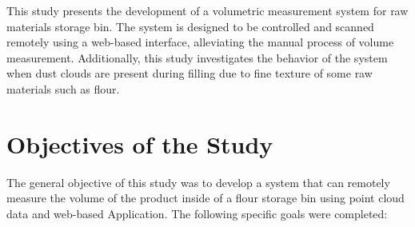 

This study presents the development of a volumetric measurement system for raw materials storage bin. The system is designed to be controlled and scanned remotely using a web-based interface, alleviating the manual process of volume measurement. Additionally, this study investigates the behavior of the system when dust clouds are present during filling due to fine texture of some raw materials such as flour.


\section{Objectives of the Study}
\label{intro:sec:Objectives of the Study}
The general objective of this study was to develop a system that can remotely measure the volume of the product inside of a flour storage bin using point cloud data and web-based Application. The following specific goals were completed:

